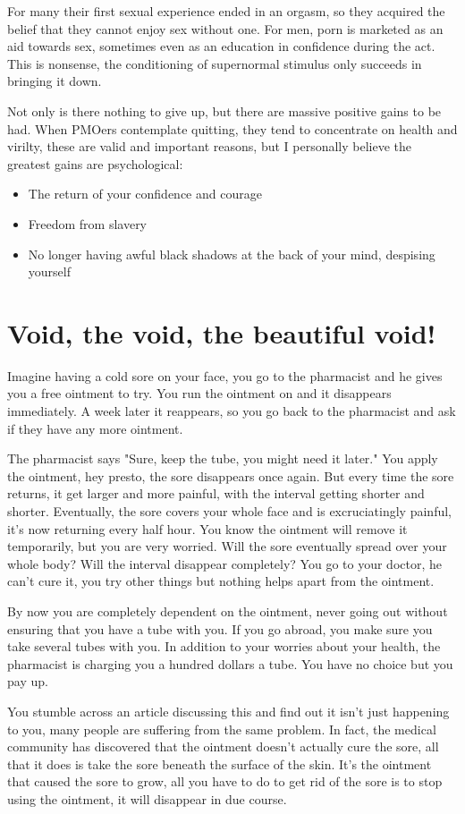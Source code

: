 \documentclass[easypeasy.tex]{subfiles}
\begin{document}
For many their first sexual experience ended in an orgasm, so they acquired the belief that they cannot enjoy sex without one. For men, porn is marketed as an aid towards sex, sometimes even as an education in confidence during the act. This is nonsense, the conditioning of supernormal stimulus only succeeds in bringing it down.

Not only is there nothing to give up, but there are massive positive gains to be had. When PMOers contemplate quitting, they tend to concentrate on health and virilty, these are valid and important reasons, but I personally believe the greatest gains are psychological:
\begin{itemize}
  \item The return of your confidence and courage
  \item Freedom from slavery
  \item No longer having awful black shadows at the back of your mind, despising yourself
\end{itemize}
\section{Void, the void, the beautiful void!}
Imagine having a cold sore on your face, you go to the pharmacist and he gives you a free ointment to try. You run the ointment on and it disappears immediately. A week later it reappears, so you go back to the pharmacist and ask if they have any more ointment.

The pharmacist says "Sure, keep the tube, you might need it later."
You apply the ointment, hey presto, the sore disappears once again. But every time the sore returns, it get larger and more painful, with the interval getting shorter and shorter. Eventually, the sore covers your whole face and is excruciatingly painful, it's now returning every half hour. You know the ointment will remove it temporarily, but you are very worried. Will the sore eventually spread over your whole body? Will the interval disappear completely? You go to your doctor, he can't cure it, you try other things but nothing helps apart from the ointment.

By now you are completely dependent on the ointment, never going out without ensuring that you have a tube with you. If you go abroad, you make sure you take several tubes with you. In addition to your worries about your health, the pharmacist is charging you a hundred dollars a tube. You have no choice but you pay up.

You stumble across an article discussing this and find out it isn't just happening to you, many people are suffering from the same problem. In fact, the medical community has discovered that the ointment doesn't actually cure the sore, all that it does is take the sore beneath the surface of the skin. It's the ointment that caused the sore to grow, all you have to do to get rid of the sore is to stop using the ointment, it will disappear in due course.
\end{document}
